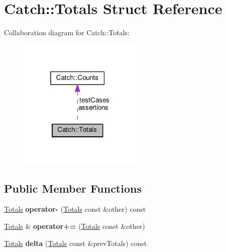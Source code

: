 \hypertarget{structCatch_1_1Totals}{}\section{Catch\+:\+:Totals Struct Reference}
\label{structCatch_1_1Totals}


Collaboration diagram for Catch\+:\+:Totals\+:
\nopagebreak
\begin{figure}[H]
\begin{center}
\leavevmode
\includegraphics[width=169pt]{structCatch_1_1Totals__coll__graph}
\end{center}
\end{figure}
\subsection*{Public Member Functions}
\begin{DoxyCompactItemize}
\item 
\hyperlink{structCatch_1_1Totals}{Totals} {\bfseries operator-\/} (\hyperlink{structCatch_1_1Totals}{Totals} const \&other) const \hypertarget{structCatch_1_1Totals_abe15cd8a82ba9a4868dd7a542add827c}{}\label{structCatch_1_1Totals_abe15cd8a82ba9a4868dd7a542add827c}

\item 
\hyperlink{structCatch_1_1Totals}{Totals} \& {\bfseries operator+=} (\hyperlink{structCatch_1_1Totals}{Totals} const \&other)\hypertarget{structCatch_1_1Totals_a574015076e54cc405c70b053e3356e43}{}\label{structCatch_1_1Totals_a574015076e54cc405c70b053e3356e43}

\item 
\hyperlink{structCatch_1_1Totals}{Totals} {\bfseries delta} (\hyperlink{structCatch_1_1Totals}{Totals} const \&prev\+Totals) const \hypertarget{structCatch_1_1Totals_a3dee0f599c081a8360c0112fb1dafe8f}{}\label{structCatch_1_1Totals_a3dee0f599c081a8360c0112fb1dafe8f}

\end{DoxyCompactItemize}
